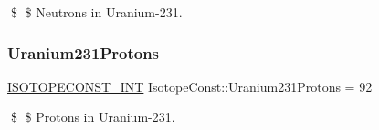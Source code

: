 \$ \$ Neutrons in Uranium-\/231. \mbox{\label{group___isotope_const-_uranium-_u231_ga634f699c2d90ae517f3d6eda2232c7ce}} 
\subsubsection{\texorpdfstring{Uranium231\+Protons}{Uranium231Protons}}
{\footnotesize\ttfamily \mbox{\hyperlink{group___isotope_const-_macros_ga5f18360b3e99483a35c32d789e62621c}{I\+S\+O\+T\+O\+P\+E\+C\+O\+N\+S\+T\+\_\+\+I\+NT}} Isotope\+Const\+::\+Uranium231\+Protons = 92}

\$ \$ Protons in Uranium-\/231. 